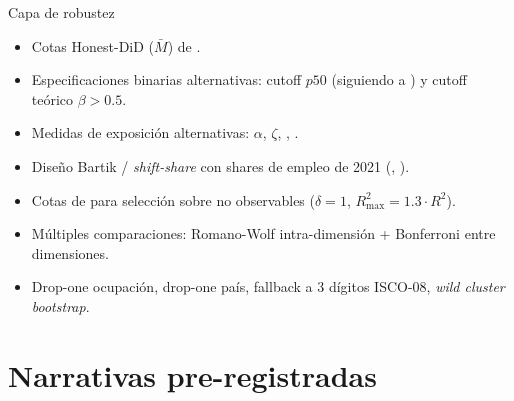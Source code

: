 \documentclass[9pt, aspectratio=169]{beamer}
\begin{document}
\begin{frame}{Capa de robustez}
  \small
  \begin{itemize}
    \setlength\itemsep{0.35em}
    \item Cotas Honest-DiD ($\bar M$) de \citet{RambachanRoth2023_honest}.
    \item Especificaciones binarias alternativas: cutoff $p50$ (siguiendo a \citet{Liu2025_generate_future}) y cutoff teórico $\beta > 0.5$.
    \item Medidas de exposición alternativas: $\alpha$, $\zeta$, \citet{Webb2020_ai_exposure}, \citet{Felten2023_ai_exposure}.
    \item Diseño Bartik / \emph{shift-share} con shares de empleo de 2021 (\citet{GoldsmithPinkham2020_bartik}, \citet{BorusyakHJ2022_shiftshare}).
    \item Cotas de \citet{Oster2019_unobservables} para selección sobre no observables ($\delta = 1$, $R^2_{\max} = 1.3 \cdot R^2$).
    \item Múltiples comparaciones: Romano-Wolf intra-dimensión + Bonferroni entre dimensiones.
    \item Drop-one ocupación, drop-one país, fallback a 3 dígitos ISCO-08, \emph{wild cluster bootstrap}.
  \end{itemize}
\end{frame}

\section{Narrativas pre-registradas}
\end{document}
